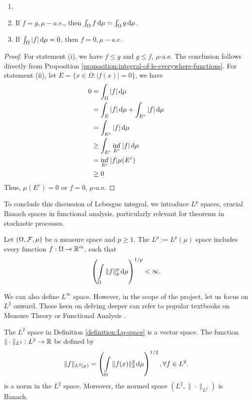 \begin{corollary}
 \begin{enumerate}[label=(\roman*), ref=(\roman*)]
  \item []
  \item If $f = g, \mu-a.e.$, then $\int_\Omega f\,\mathrm{d} \mu =  \int_\Omega g\,\mathrm{d} \mu$.
  \item If $\int_\Omega |f|\,\mathrm{d} \mu = 0$, then $f=0,\mu-a.e.$
 \end{enumerate}
\end{corollary}

\begin{proof}
 For statement (i), we have $f\le g$ and $g\le f$, $\mu$-a.e. The conclusion follows directly from Proposition \ref{proposition:integral-of-le-everywhere-functions}. For statement (ii), let $E = \{x\in\Omega : |f(x)| = 0\}$, we have
 \begin{align*}
  0
   & = \int_\Omega |f|\,\mathrm{d} \mu                    \\
   & = \int_E |f|\,\mathrm{d} \mu + \int_{E^c} |f|\,\mathrm{d} \mu  \\
   & = \int_{E^c} |f|\,\mathrm{d} \mu                     \\
   & \ge \int_{E^c} \inf\limits_{E^c} |f|\,\mathrm{d} \mu \\
   & = \inf\limits_{E^c} |f| \mu (E^c)          \\
   & \ge 0
 \end{align*}
 Thus, $\mu (E^c)=0$ or $f=0$, $\mu$-a.e.
\end{proof}

To conclude this discussion of Lebesgue integral, we introduce $L^p$ spaces, crucial Banach spaces in functional analysis, particularly relevant for theorems in stochastic processes.

\begin{definition}
 \label{definition:Lp-space}
 Let $(\Omega,\mathcal{F},\mu)$ be a measure space and $p\ge1$. The $L^p := L^p(\mu)$ space includes every function $f:\Omega\to\mathbb{R}^m$, such that
 $$\left(\int\limits_\Omega \|f\|^p_p\,\mathrm{d} \mu\right)^{1/p}<\infty.$$
\end{definition}

\begin{remark}
 We can also define $L^\infty$ space. However, in the scope of the project, let us focus on $L^2$ onward. Those keen on delving deeper can refer to popular textbooks on Measure Theory \cite{cohn2013measure} or Functional Analysis \cite{rudin1987functional}.
\end{remark}

\begin{theorem}
 \label{theorem:L2-is-Banach}
 The $L^2$ space in Definition \ref{definition:Lp-space} is a vector space. The function $\|\cdot\|_{L^2} : L^2\to\mathbb{R}$ be defined by
 $$\|f\|_{L^2(\mu)}=\left(\int\limits_\Omega \|f(x)\|^2_2\,\mathrm{d} \mu\right)^{1/2}, \forall f\in L^2.$$
 is a norm in the $L^2$ space. Moreover, the normed space $(L^2, \|\cdot\|_{L^2})$ is Banach.
\end{theorem}

